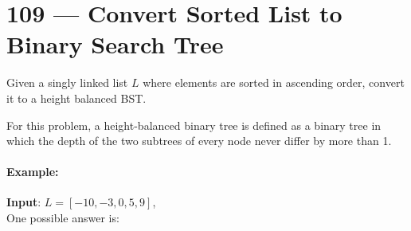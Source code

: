 \section{109 --- Convert Sorted List to Binary Search Tree}
Given a singly linked list $L$ where elements are sorted in ascending order, convert it to a height balanced BST.
\par
For this problem, a height-balanced binary tree is defined as a binary tree in which the depth of the two subtrees of every node never differ by more than 1.
\paragraph{Example:}
\begin{flushleft}
\textbf{Input}: $L = [-10,-3,0,5,9]$,
\\
One possible answer is:
\begin{figure}[H]
\end{figure}
 \end{flushleft}
